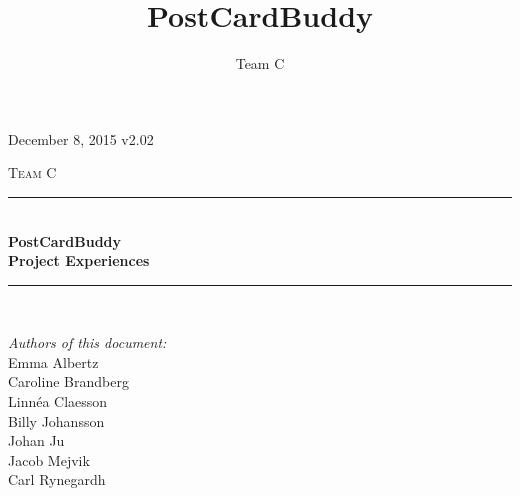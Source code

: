 \documentclass[10pt,a4paper]{article}
\title{PostCardBuddy}
\author{Team C}
\begin{document}
\begin{titlepage}
\newcommand{\HRule}{\rule{\linewidth}{0.5mm}}


\begin{flushright}
December 8, 2015 v2.02\\[3cm]
\end{flushright}


\centering
\textsc{\LARGE Team C}\\[0.5cm]

\HRule \\[0.4cm]
{ \huge \bfseries PostCardBuddy}\\[0.3cm]
{\Large \bfseries Project Experiences}\\[0.4cm] %
\HRule \\[1.5cm]

\vfill
\begin{flushleft}
\textit{Authors of this document:}\\
Emma Albertz\\
Caroline Brandberg\\
Linnéa Claesson\\
Billy Johansson\\
Johan Ju\\
Jacob Mejvik\\
Carl Rynegardh
\end{flushleft}

\end{titlepage}



%



\setcounter{tocdepth}{2}
\tableofcontents
\newpage
{}

\end{document}
